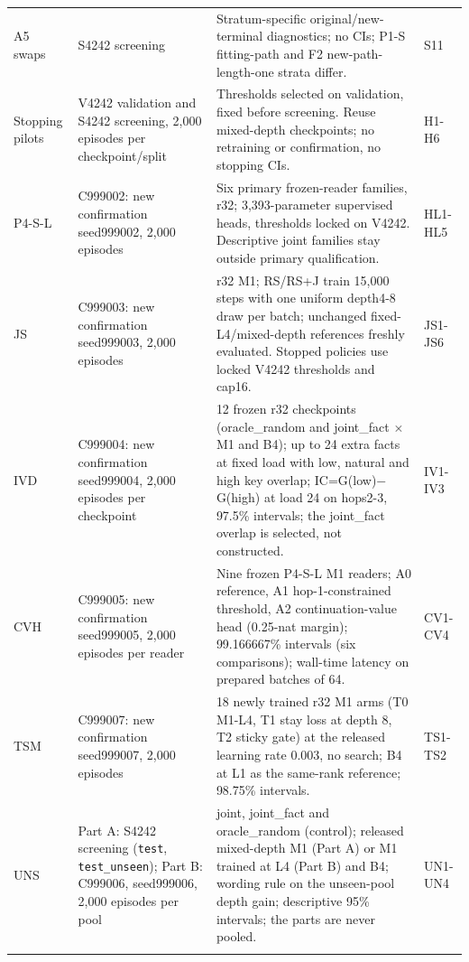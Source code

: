 {\begin{longtable}{W{83}{8}W{346}{8}W{487}{8}W{83}{8}}
A5 swaps & S4242 screening & Stratum-specific original/\allowbreak{}new-terminal diagnostics; no CIs; P1-S fitting-path and F2 new-path-length-one strata differ. & S11 \\ \addlinespace[3pt]  %
Stopping pilots & V4242 validation and S4242 screening, 2,000 episodes per checkpoint/\allowbreak{}split & Thresholds selected on validation, fixed before screening. Reuse mixed-depth checkpoints; no retraining or confirmation, no stopping CIs. & H1-H6 \\ \addlinespace[3pt]  %
P4-S-L & C999002: new confirmation seed999002, 2,000 episodes & Six primary frozen-reader families, r32; 3,393-parameter supervised heads, thresholds locked on V4242. Descriptive joint families stay outside primary qualification. & HL1-HL5 \\ \addlinespace[3pt]  %
JS & C999003: new confirmation seed999003, 2,000 episodes & r32 M1; RS/\allowbreak{}RS+J train 15,000 steps with one uniform depth4-8 draw per batch; unchanged fixed-L4/\allowbreak{}mixed-depth references freshly evaluated. Stopped policies use locked V4242 thresholds and cap16. & JS1-JS6 \\ \addlinespace[3pt]  %
IVD & C999004: new confirmation seed999004, 2,000 episodes per checkpoint & 12 frozen r32 checkpoints (oracle\_random and joint\_fact \ensuremath{\times} M1 and B4); up to 24 extra facts at fixed load with low, natural and high key overlap; IC=G(low)\ensuremath{-}G(high) at load 24 on hops2-3, 97.5\% intervals; the joint\_fact overlap is selected, not constructed. & IV1-IV3 \\ \addlinespace[3pt]  %
CVH & C999005: new confirmation seed999005, 2,000 episodes per reader & Nine frozen P4-S-L M1 readers; A0 reference, A1 hop-1-constrained threshold, A2 continuation-value head (0.25-nat margin); 99.166667\% intervals (six comparisons); wall-time latency on prepared batches of 64. & CV1-CV4 \\ \addlinespace[3pt]  %
TSM & C999007: new confirmation seed999007, 2,000 episodes & 18 newly trained r32 M1 arms (T0 M1-L4, T1 stay loss at depth 8, T2 sticky gate) at the released learning rate 0.003, no search; B4 at L1 as the same-rank reference; 98.75\% intervals. & TS1-TS2 \\ \addlinespace[3pt]  %
UNS & Part A: S4242 screening (\texttt{test}, \texttt{test\_unseen}); Part B: C999006, seed999006, 2,000 episodes per pool & joint, joint\_fact and oracle\_random (control); released mixed-depth M1 (Part A) or M1 trained at L4 (Part B) and B4; wording rule on the unseen-pool depth gain; descriptive 95\% intervals; the parts are never pooled. & UN1-UN4 \\ \addlinespace[3pt]  %

\end{longtable}}

